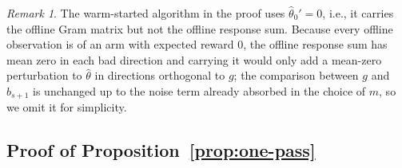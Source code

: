 \documentclass{article}
\theoremstyle{definition}
\theoremstyle{remark}
\newtheorem{remark}{Remark}
\theoremstyle{remark}
\begin{document}
\begin{remark}
The warm-started algorithm in the proof uses $\widehat\theta_0'=0$, i.e., it
carries the offline Gram matrix but not the offline response sum. Because
every offline observation is of an arm with expected reward $0$, the offline
response sum has mean zero in each bad direction and carrying it would only
add a mean-zero perturbation to $\widehat\theta$ in directions orthogonal to
$g$; the comparison between $g$ and $b_{s+1}$ is unchanged up to the noise
term already absorbed in the choice of $m$, so we omit it for simplicity.
\end{remark}

\subsection{Proof of Proposition~\ref{prop:one-pass}}
\label{app:proof-one-pass}
\end{document}
